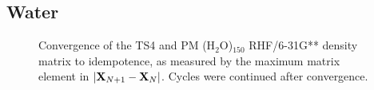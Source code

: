\commentoutA{\documentclass[prb,aps,twocolumn,twocolumngrid,secnumarabic,superbib,hyperref]{revtex4}}
\begin{document}
{%


\subsection{Water}

\begin{figure}[t]
\caption{Convergence of the TS4 and PM  (H$_2$O)$_{150}$ RHF/6-31G** 
density matrix to idempotence, as measured by the maximum matrix element in 
$|{\bf X}_{N+1}-{\bf X}_N|$. Cycles were continued after convergence.}\label{waterconvergence}
\end{figure}

}
\end{document}
